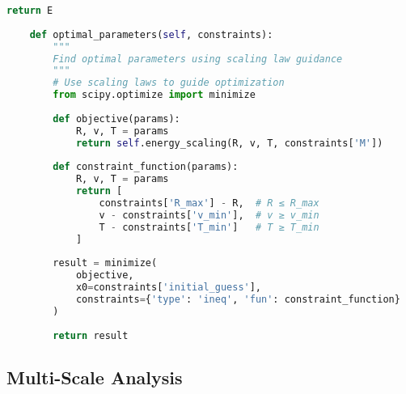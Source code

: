 \documentclass[12pt,a4paper]{article}
\begin{document}
\begin{lstlisting}[language=Python]
        return E
    
    def optimal_parameters(self, constraints):
        """
        Find optimal parameters using scaling law guidance
        """
        # Use scaling laws to guide optimization
        from scipy.optimize import minimize
        
        def objective(params):
            R, v, T = params
            return self.energy_scaling(R, v, T, constraints['M'])
        
        def constraint_function(params):
            R, v, T = params
            return [
                constraints['R_max'] - R,  # R ≤ R_max
                v - constraints['v_min'],  # v ≥ v_min
                T - constraints['T_min']   # T ≥ T_min
            ]
        
        result = minimize(
            objective,
            x0=constraints['initial_guess'],
            constraints={'type': 'ineq', 'fun': constraint_function}
        )
        
        return result
\end{lstlisting}

\subsection{Multi-Scale Analysis}
\end{document}
